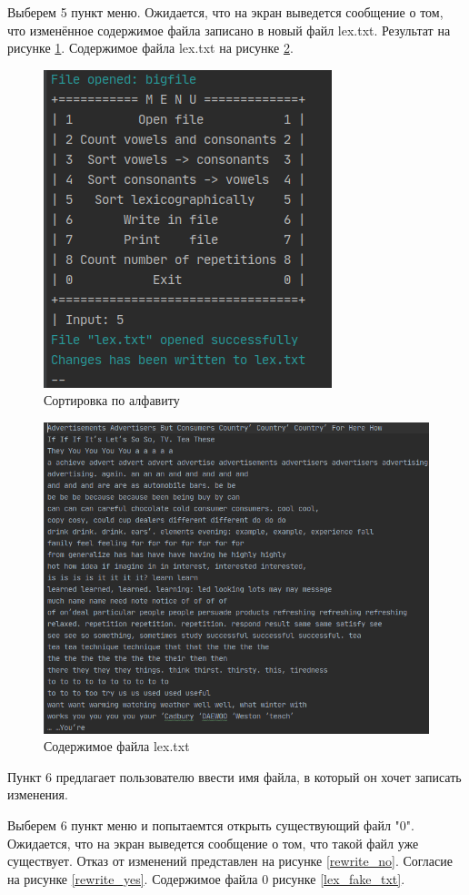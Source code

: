 \documentclass[12pt,a4paper]{article}  %
\begin{document}
Выберем 5 пункт меню. Ожидается, что на экран выведется сообщение о том, что изменённое содержимое файла записано в новый файл lex.txt. Результат на рисунке \ref{lex}. Содержимое файла lex.txt на рисунке \ref{lex_txt}.
\begin{figure}[htp!]
	\centering
	\includegraphics[width=0.5\linewidth]{photo/tests/lex}
	\caption{Сортировка по алфавиту}
	\label{lex}
\end{figure}

\begin{figure}[htp!]
	\centering
	\includegraphics[width=0.9\linewidth]{photo/tests/lex_txt}
	\caption{Содержимое файла lex.txt}
	\label{lex_txt}
\end{figure}

Пункт 6 предлагает пользователю ввести имя файла, в который он хочет записать изменения. 

Выберем 6 пункт меню и попытаемтся открыть существующий файл "0". Ожидается, что на экран выведется сообщение о том, что такой файл уже существует. Отказ от изменений представлен на рисунке \ref{rewrite_no}. Согласие на рисунке \ref{rewrite_yes}. Содержимое файла 0 рисунке \ref{lex_fake_txt}.
\end{document}
